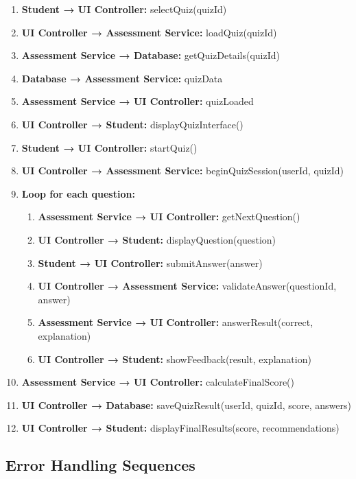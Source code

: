 \begin{enumerate}
    \item \textbf{Student → UI Controller:} selectQuiz(quizId)
    \item \textbf{UI Controller → Assessment Service:} loadQuiz(quizId)
    \item \textbf{Assessment Service → Database:} getQuizDetails(quizId)
    \item \textbf{Database → Assessment Service:} quizData
    \item \textbf{Assessment Service → UI Controller:} quizLoaded
    \item \textbf{UI Controller → Student:} displayQuizInterface()
    \item \textbf{Student → UI Controller:} startQuiz()
    \item \textbf{UI Controller → Assessment Service:} beginQuizSession(userId, quizId)
    \item \textbf{Loop for each question:}
    \begin{enumerate}
        \item \textbf{Assessment Service → UI Controller:} getNextQuestion()
        \item \textbf{UI Controller → Student:} displayQuestion(question)
        \item \textbf{Student → UI Controller:} submitAnswer(answer)
        \item \textbf{UI Controller → Assessment Service:} validateAnswer(questionId, answer)
        \item \textbf{Assessment Service → UI Controller:} answerResult(correct, explanation)
        \item \textbf{UI Controller → Student:} showFeedback(result, explanation)
    \end{enumerate}
    \item \textbf{Assessment Service → UI Controller:} calculateFinalScore()
    \item \textbf{UI Controller → Database:} saveQuizResult(userId, quizId, score, answers)
    \item \textbf{UI Controller → Student:} displayFinalResults(score, recommendations)
\end{enumerate}

\subsection{Error Handling Sequences}

